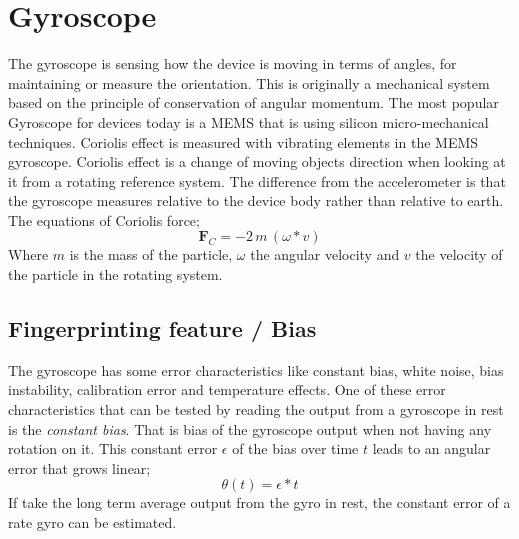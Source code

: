 \section{Gyroscope}\label{sec:gyroscope}
The gyroscope is sensing how the device is moving in terms of angles, for maintaining or measure the orientation. This is originally  a mechanical system based on the principle of conservation of angular momentum. The most popular Gyroscope for devices today is a MEMS that is using silicon micro-mechanical techniques. Coriolis effect is measured with vibrating elements in the MEMS gyroscope. Coriolis effect is a change of moving objects direction when looking at it from a rotating reference system. The difference from the accelerometer is that the gyroscope measures relative to the device body rather than relative to earth. The equations of Coriolis force;  
$$\boldsymbol{ F}_C = -2 \, m \, (\omega *  v)$$
Where $m$ is the mass of the particle, $\omega$ the angular velocity and $v$ the velocity of the particle in the rotating system. 
\cite[]{sensor:inertialNav}
\subsection{Fingerprinting feature / Bias}
The gyroscope has some error characteristics like constant bias, white noise, bias instability, calibration error and temperature effects. One of these error characteristics that can be tested by reading the output from a gyroscope in rest is the \textit{constant bias}. That is bias of the gyroscope output when not having any rotation on it. This constant error $\epsilon$ of the bias over time $t$ leads to an angular error that grows linear; 
\begin{equation} \label{eq:gyroBias}
\theta (t)= \epsilon * t
\end{equation}
If take the long term average output from the gyro in rest, the constant error of a rate gyro can be estimated.\cite[]{sensors:fusion}


